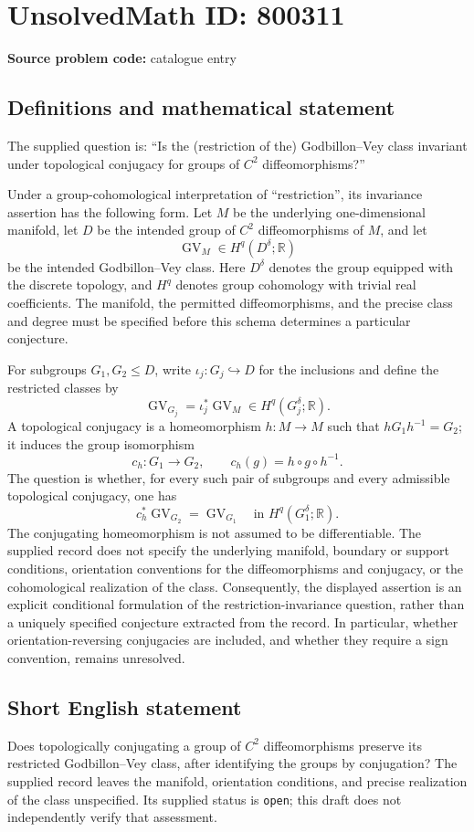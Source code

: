 \documentclass[11pt]{article}
\newcommand{\R}{\mathbb{R}}
\begin{document}
\section*{UnsolvedMath ID: 800311}
\textbf{Source problem code:} catalogue entry
\subsection{Definitions and mathematical statement}
The supplied question is: ``Is the (restriction of the) Godbillon--Vey class invariant under topological conjugacy for groups of \(C^2\) diffeomorphisms?''

Under a group-cohomological interpretation of ``restriction'', its invariance assertion has the following form. Let \(M\) be the underlying one-dimensional manifold, let \(D\) be the intended group of \(C^2\) diffeomorphisms of \(M\), and let
\[
\operatorname{GV}_M\in H^q(D^\delta;\R)
\]
be the intended Godbillon--Vey class. Here \(D^\delta\) denotes the group equipped with the discrete topology, and \(H^q\) denotes group cohomology with trivial real coefficients. The manifold, the permitted diffeomorphisms, and the precise class and degree must be specified before this schema determines a particular conjecture.

For subgroups \(G_1,G_2\leq D\), write \(\iota_j:G_j\hookrightarrow D\) for the inclusions and define the restricted classes by
\[
\operatorname{GV}_{G_j}=\iota_j^*\operatorname{GV}_M
\in H^q(G_j^\delta;\R).
\]
A topological conjugacy is a homeomorphism \(h:M\to M\) such that \(hG_1h^{-1}=G_2\); it induces the group isomorphism
\[
c_h:G_1\longrightarrow G_2,\qquad c_h(g)=h\circ g\circ h^{-1}.
\]
The question is whether, for every such pair of subgroups and every admissible topological conjugacy, one has
\[
 c_h^*\operatorname{GV}_{G_2}=\operatorname{GV}_{G_1}
 \quad\text{in }H^q(G_1^\delta;\R).
\]
The conjugating homeomorphism is not assumed to be differentiable. The supplied record does not specify the underlying manifold, boundary or support conditions, orientation conventions for the diffeomorphisms and conjugacy, or the cohomological realization of the class. Consequently, the displayed assertion is an explicit conditional formulation of the restriction-invariance question, rather than a uniquely specified conjecture extracted from the record. In particular, whether orientation-reversing conjugacies are included, and whether they require a sign convention, remains unresolved.
\subsection{Short English statement}
Does topologically conjugating a group of \(C^2\) diffeomorphisms preserve its restricted Godbillon--Vey class, after identifying the groups by conjugation? The supplied record leaves the manifold, orientation conditions, and precise realization of the class unspecified. Its supplied status is \texttt{open}; this draft does not independently verify that assessment.
\end{document}
